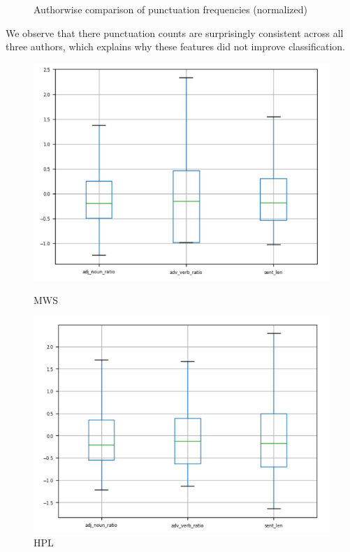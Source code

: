\documentclass[12pt]{article}
\begin{document}
\begin{figure}[h]
\begin{multicols}{3}
  \end{multicols} 

  \caption{Authorwise comparison of punctuation frequencies (normalized)}
  \label{fig:punc}

\end{figure}

We observe that there punctuation counts are surprisingly consistent across all three authors, which explains why these features did not improve classification.
\vskip 0.2in
\begin{figure}[h]
  \begin{multicols}{3}
      \includegraphics[width=\linewidth]{images/ratio_mws.png}\par\caption{MWS}
      \includegraphics[width=\linewidth]{images/ratio_hpl.png}\par\caption{HPL}

\end{multicols}
\end{figure}
\end{document}
